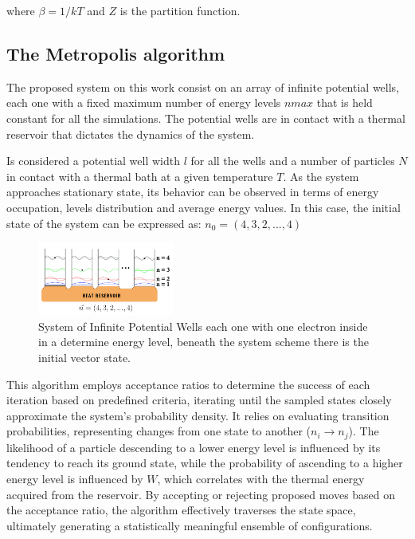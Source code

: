 \documentclass[%
 reprint,
 amsmath,amssymb,
 aps,
]{revtex4-2}
\begin{document}
where $\beta=1 / k T$ and $Z$ is the partition function. \\

\subsection{The Metropolis algorithm}

The proposed system on this work consist on an array of infinite potential wells, each one with a fixed maximum number of energy levels $nmax$ that is held constant for all the simulations. The potential wells are in contact with a thermal reservoir that dictates the dynamics of the system. \par
Is considered a potential well width $l$ for all the wells and a number of particles $N$ in contact with a thermal bath at a given temperature $T$. As the system approaches stationary state, its behavior can be observed in terms of energy occupation, levels distribution and average energy values.
In this case, the initial state of the system can be expressed as: 
$n_0 = (4, 3, 2, ..., 4)$
\par
\begin{figure}[h]
    \centering
    \includegraphics[width=0.4\textwidth]{reservoir.png} %
    \caption{System of Infinite Potential Wells each one with one electron inside in a determine energy level, beneath the system scheme there is the initial vector state. }
    \label{fig:example}
\end{figure}

This algorithm employs acceptance ratios to determine the success of each iteration based on predefined criteria, iterating until the sampled states closely approximate the system's probability density. It relies on evaluating transition probabilities, representing changes from one state to another ($n_i \rightarrow n_j$). The likelihood of a particle descending to a lower energy level is influenced by its tendency to reach its ground state, while the probability of ascending to a higher energy level is influenced by $W$, which correlates with the thermal energy acquired from the reservoir. By accepting or rejecting proposed moves based on the acceptance ratio, the algorithm effectively traverses the state space, ultimately generating a statistically meaningful ensemble of configurations.
\end{document}
